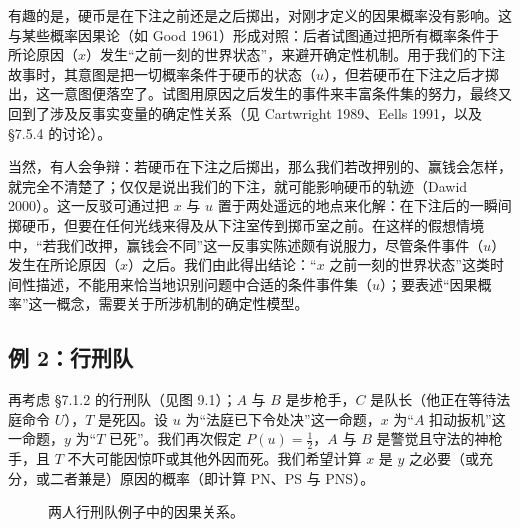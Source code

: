 有趣的是，硬币是在下注之前还是之后掷出，对刚才定义的因果概率没有影响。这与某些概率因果论（如 Good 1961）形成对照：后者试图通过把所有概率条件于所论原因（$x$）发生“之前一刻的世界状态”，来避开确定性机制。用于我们的下注故事时，其意图是把一切概率条件于硬币的状态（$u$），但若硬币在下注之后才掷出，这一意图便落空了。试图用原因之后发生的事件来丰富条件集的努力，最终又回到了涉及反事实变量的确定性关系（见 Cartwright 1989、Eells 1991，以及 \S 7.5.4 的讨论）。

当然，有人会争辩：若硬币在下注之后掷出，那么我们若改押别的、赢钱会怎样，就完全不清楚了；仅仅是说出我们的下注，就可能影响硬币的轨迹（Dawid 2000）。这一反驳可通过把 $x$ 与 $u$ 置于两处遥远的地点来化解：在下注后的一瞬间掷硬币，但要在任何光线来得及从下注室传到掷币室之前。在这样的假想情境中，“若我们改押，赢钱会不同”这一反事实陈述颇有说服力，尽管条件事件（$u$）发生在所论原因（$x$）之后。我们由此得出结论：“$x$ 之前一刻的世界状态”这类时间性描述，不能用来恰当地识别问题中合适的条件事件集（$u$）；要表述“因果概率”这一概念，需要关于所涉机制的确定性模型。

\subsection{例 2：行刑队}

再考虑 \S 7.1.2 的行刑队（见图 9.1）；$A$ 与 $B$ 是步枪手，$C$ 是队长（他正在等待法庭命令 $U$），$T$ 是死囚。设 $u$ 为“法庭已下令处决”这一命题，$x$ 为“$A$ 扣动扳机”这一命题，$y$ 为“$T$ 已死”。我们再次假定 $P(u)=\frac12$，$A$ 与 $B$ 是警觉且守法的神枪手，且 $T$ 不大可能因惊吓或其他外因而死。我们希望计算 $x$ 是 $y$ 之必要（或充分，或二者兼是）原因的概率（即计算 PN、PS 与 PNS）。

\begin{figure}[htbp]
\centering
{}
\caption{两人行刑队例子中的因果关系。}
\label{fig:9.1}
\end{figure}

